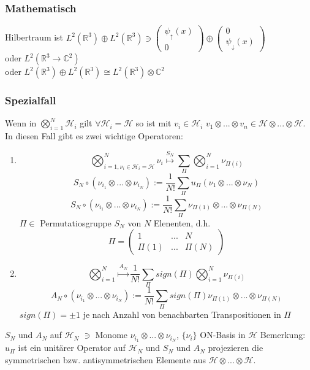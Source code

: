 \documentclass[twoside,a4paper]{scrartcl}
\renewcommand{\1}{\mathds{1}}
\newcommand{\ra}{\rightarrow}
\begin{document}
\subsubsection*{Mathematisch}
Hilbertraum ist $L^2(\mathbb R^3) \oplus L^2(\mathbb R^3) \ni \begin{pmatrix} \psi_\uparrow(x) \\ 0\end{pmatrix} \oplus \begin{pmatrix} 0 \\ \psi_\downarrow(x)\end{pmatrix}$\\
oder $L^2(\mathbb R^3 \ra \mathbb C^2)$\\
oder $L^2(\mathbb R^3) \oplus L^2(\mathbb R^3)\cong L^2(\mathbb R^3) \otimes \mathbb C^2$\\
\subsubsection*{Spezialfall}
Wenn in $\bigotimes_{i=1}^N \mathcal H_i$ gilt $\forall \mathcal H_i=\mathcal H $ so ist mit $v_i \in \mathcal H_i$ $v_1\otimes ...\otimes v_n \in \mathcal H \otimes ...\otimes \mathcal H$.\\
In diesen Fall gibt es zwei wichtige Operatoren:
\begin{enumerate}
 \item $$\bigotimes_{i=1,\nu_i\in \mathcal H_i=\mathcal H}^N\nu_i \stackrel{S_N}{\mapsto}\sum_\Pi \bigotimes_{i=1}^N \nu_{\Pi(i)}$$
$$S_N \circ (\nu_{i_1} \otimes ... \otimes \nu_{i_N}):=\frac{1}{N!}\sum_\Pi u_\Pi(\nu_{1} \otimes ... \otimes \nu_{N})$$
$$S_N \circ (\nu_{i_1} \otimes ... \otimes \nu_{i_N}):=\frac{1}{N!}\sum_\Pi \nu_{\Pi(1)} \otimes ... \otimes \nu_{\Pi(N)}$$
$\Pi \in$ Permutatiosgruppe $S_N$ von $N$ Elenenten, d.h. $$\Pi=\begin{pmatrix}1 & ... & N \\ \Pi(1) & ... & \Pi(N)\end{pmatrix}$$ 
\item $$\bigotimes_{i=1}^N \stackrel{A_N}{\mapsto} \frac{1}{N!}\sum_\Pi sign(\Pi) \bigotimes_{i=1}^N \nu_{\Pi(i)}$$
$$A_N \circ (\nu_{i_1} \otimes ... \otimes \nu_{i_N}):=\frac{1}{N!}\sum_\Pi sign(\Pi) \nu_{\Pi(1)} \otimes ... \otimes \nu_{\Pi(N)}$$
$sign(\Pi)=\pm 1$ je nach Anzahl von benachbarten Transpositionen in $\Pi$
\end{enumerate}
$S_N$ und $A_N$ auf $\mathcal H_N$ $\ni$ Monome $\nu_{i_1} \otimes ... \otimes \nu_{i_N}$, $\{\nu_{i}\}$ ON-Basis in $\mathcal H$
Bemerkung: $u_\Pi$ ist ein unitärer Operator auf $\mathcal H_N$ und $S_N$ und $A_N$ projezieren die symmetrischen bzw. antisymmetrischen Elemente aus $\mathcal H \otimes ... \otimes \mathcal H$.
\end{document}
